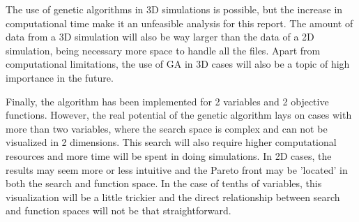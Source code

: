 The use of genetic algorithms in 3D simulations is possible, but the increase in computational time make it an unfeasible analysis for this report. The amount of data from a 3D simulation will also be way larger than the data of a 2D simulation, being necessary more space to handle all the files. Apart from computational limitations, the use of GA in 3D cases will also be a topic of high importance in the future.

Finally, the algorithm has been implemented for 2 variables and 2 objective functions. However, the real potential of the genetic algorithm lays on cases with more than two variables, where the search space is complex and can not be visualized in 2 dimensions. This search will also require higher computational resources and more time will be spent in doing simulations. In 2D cases, the results may seem more or less intuitive and the Pareto front may be 'located' in both the search and function space. In the case of tenths of variables, this visualization will be a little trickier and the direct relationship between search and function spaces will not be that straightforward. 